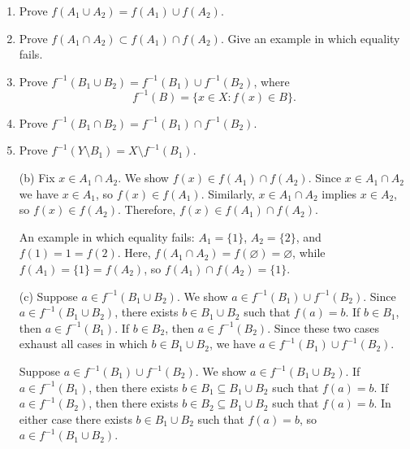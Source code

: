 \documentclass[12pt,reqno]{amsart}
\renewcommand{\emptyset}{\ensuremath{\varnothing}}
\begin{document}
\begin{enumerate}[{\bf 1.}]
\begin{enumerate}
\item
Prove $f( A_1 \cup A_2 ) = f( A_1) \cup f( A_2 )$.
 
\item
Prove $f( A_1 \cap A_2 ) \subset f( A_1) \cap f( A_2 )$.  Give an example in which equality fails.
 
\item
Prove $f^{-1}( B_1 \cup B_2 ) = f^{-1}( B_1) \cup f^{-1}(B_2 )$, where
\[
f^{-1}(B) = \{ x \in X : f(x) \in B \}.
\]
 
\item
Prove $f^{-1}( B_1 \cap B_2 ) = f^{-1}( B_1) \cap f^{-1}( B_2 )$. 
 
\item
Prove $f^{-1}( Y \setminus B_1 ) = X \setminus f^{-1}( B_1)$.
 
\end{enumerate}
\bigskip
{}
\medskip
\begin{enumerate}
\item[(b)] 
Fix $x \in A_1 \cap A_2$.  We show $f(x) \in f(A_1) \cap f(A_2)$.
Since $x \in A_1 \cap A_2$ we have $x \in A_1$, so $f(x) \in f(A_1)$.
Similarly, $x \in A_1 \cap A_2$ implies $x \in A_2$, so $f(x) \in f(A_2)$.
Therefore, $f(x) \in f(A_1) \cap f(A_2)$.

An example in which equality fails: $A_1 = \{1\}$,
$A_2 = \{2\}$, and $f(1) = 1 = f(2)$.  
Here, $f(A_1\cap A_2) = f(\emptyset) = \emptyset$, while 
$f(A_1) = \{1 \} = f(A_2)$, so 
$f(A_1)\cap f(A_2) = \{1 \}$.

\medskip

\item[(c)] Suppose $a \in f^{-1}(B_1 \cup B_2)$.  
We show $a \in f^{-1}(B_1) \cup f^{-1}(B_2)$.
Since $a \in f^{-1}(B_1 \cup B_2)$, there exists 
$b \in B_1\cup B_2$ such that $f(a) = b$.
If $b \in B_1$, then $a\in f^{-1}(B_1)$.
If $b \in B_2$, then $a\in f^{-1}(B_2)$. 
Since these two cases exhaust all cases
in which $b \in B_1\cup B_2$, 
we have $a \in f^{-1}(B_1) \cup f^{-1}(B_2)$.

Suppose $a \in f^{-1}(B_1) \cup f^{-1}(B_2)$.
We show $a \in f^{-1}(B_1 \cup B_2)$.  
If $a \in f^{-1}(B_1)$, then 
there exists $b \in B_1 \subseteq B_1 \cup B_2$ such that $f(a) = b$.
If $a \in f^{-1}(B_2)$, then 
there exists $b \in B_2 \subseteq B_1 \cup B_2$ such that $f(a) = b$.
In either case 
there exists $b \in B_1 \cup B_2$ such that $f(a) = b$, so 
$a \in f^{-1}(B_1 \cup B_2)$.


\end{enumerate}
 

\end{enumerate}
\end{document}
